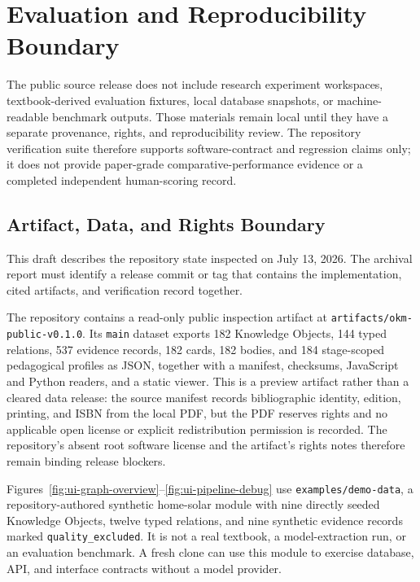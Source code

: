 \documentclass[11pt,letterpaper]{article}
\newcommand{\code}[1]{\nolinkurl{#1}}
\begin{document}
\section{Evaluation and Reproducibility Boundary}

The public source release does not include research experiment workspaces, textbook-derived evaluation fixtures, local database snapshots, or machine-readable benchmark outputs. Those materials remain local until they have a separate provenance, rights, and reproducibility review. The repository verification suite therefore supports software-contract and regression claims only; it does not provide paper-grade comparative-performance evidence or a completed independent human-scoring record.

\subsection{Artifact, Data, and Rights Boundary}

This draft describes the repository state inspected on July 13, 2026. The archival report must identify a release commit or tag that contains the implementation, cited artifacts, and verification record together.

The repository contains a read-only public inspection artifact at \code{artifacts/okm-public-v0.1.0}. Its \code{main} dataset exports 182 Knowledge Objects, 144 typed relations, 537 evidence records, 182 cards, 182 bodies, and 184 stage-scoped pedagogical profiles as JSON, together with a manifest, checksums, JavaScript and Python readers, and a static viewer. This is a preview artifact rather than a cleared data release: the source manifest records bibliographic identity, edition, printing, and ISBN from the local PDF, but the PDF reserves rights and no applicable open license or explicit redistribution permission is recorded. The repository's absent root software license and the artifact's rights notes therefore remain binding release blockers.

Figures~\ref{fig:ui-graph-overview}--\ref{fig:ui-pipeline-debug} use \code{examples/demo-data}, a repository-authored synthetic home-solar module with nine directly seeded Knowledge Objects, twelve typed relations, and nine synthetic evidence records marked \code{quality_excluded}. It is not a real textbook, a model-extraction run, or an evaluation benchmark. A fresh clone can use this module to exercise database, API, and interface contracts without a model provider.
\end{document}
